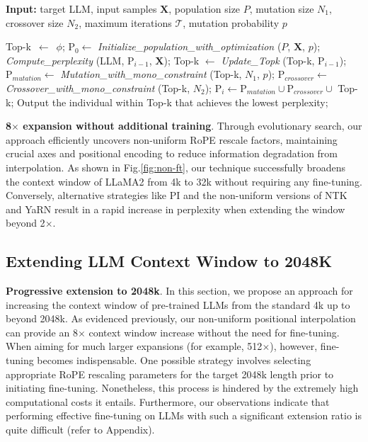 \begin{algorithm}[t]
	\small
	\caption{The search algorithm}
	\textbf{Input:} target LLM, input samples $\mathbf{X}$, population size $P$, mutation size $N_1$, crossover size $N_2$, maximum iterations $\mathcal{T}$, mutation probability $p$\\

	\begin{algorithmic}[1]
		\label{alg:search}
		\STATE Top-k $\,\gets\,$ $\phi$;
		\STATE $\text{P}_0 \gets$ \textit{Initialize\_population\_with\_optimization} ($P$, $\mathbf{X}$, $p$);
		\STATE \textit{Compute\_perplexity} (LLM, $\text{P}_{i-1}$, $\mathbf{X}$);
		\STATE Top-k $\gets$ \textit{Update\_Topk} (Top-k, $\text{P}_{i-1}$);
		\STATE $\text{P}_{mutation} \gets$ \textit{Mutation\_with\_mono\_constraint} (Top-k, $N_1$, $p$);
		\STATE $\text{P}_{crossover} \gets$ \textit{Crossover\_with\_mono\_constraint} (Top-k, $N_2$);
		\STATE $\text{P}_i \gets \text{P}_{mutation} \cup \text{P}_{crossover} \cup$ Top-k;
		\ENDFOR
		\STATE Output the individual within Top-k that achieves the lowest perplexity;
	\end{algorithmic}
\end{algorithm}

\textbf{8$\times$ expansion without additional training}. Through evolutionary search, our approach efficiently uncovers non-uniform RoPE rescale factors, maintaining crucial axes and positional encoding to reduce information degradation from interpolation. As shown in Fig.\ref{fig:non-ft}, our technique successfully broadens the context window of LLaMA2 from 4k to 32k without requiring any fine-tuning. Conversely, alternative strategies like PI and the non-uniform versions of NTK and YaRN result in a rapid increase in perplexity when extending the window beyond 2$\times$.

\subsection{Extending LLM Context Window to 2048K}
\label{sec:extendto2048k}

\textbf{Progressive extension to 2048k}. In this section, we propose an approach for increasing the context window of pre-trained LLMs from the standard 4k up to beyond 2048k. As evidenced previously, our non-uniform positional interpolation can provide an 8$\times$ context window increase without the need for fine-tuning. When aiming for much larger expansions (for example, 512$\times$), however, fine-tuning becomes indispensable. One possible strategy involves selecting appropriate RoPE rescaling parameters for the target 2048k length prior to initiating fine-tuning. Nonetheless, this process is hindered by the extremely high computational costs it entails. Furthermore, our observations indicate that performing effective fine-tuning on LLMs with such a significant extension ratio is quite difficult (refer to Appendix).

